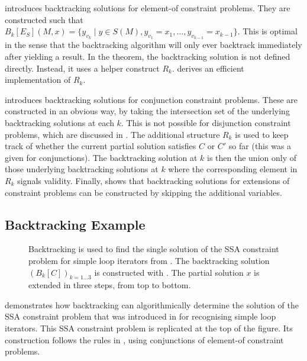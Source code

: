      introduces backtracking solutions for element-of
    constraint problems.
    They are constructed such that
    $B_k[E_S](M,x)=\{y_{v_k}\mid y\in S(M), y_{v_1}=x_1,\dots,y_{v_{k-1}}=x_{k-1}\}$.
    This is optimal in the sense that the backtracking algorithm will only ever
    backtrack immediately after yielding a result.
    In the theorem, the backtracking solution is not defined directly.
    Instead, it uses a helper construct $R_k$.
     derives an efficient implementation of $R_k$.

     introduces backtracking solutions for conjunction
    constraint problems.
    These are constructed in an obvious way, by taking the intersection set of
    the underlying backtracking solutions at each $k$.
    This is not possible for disjunction constraint problems, which are
    discussed in .
    The additional structure $R_k$ is used to keep track of whether the current
    partial solution satisfies $C$ or $C'$ so far
    (this was a given for conjunctions).
    The backtracking solution at $k$ is then the union only of those underlying
    backtracking solutions at $k$ where the corresponding element in $R_k$
    signals validity.
    Finally,  shows that backtracking solutions for extensions
    of constraint problems can be constructed by skipping the
    additional variables.

\subsection{Backtracking Example}

\begin{figure}[p]
    
    \caption{Backtracking is used to find the single solution of the
             SSA constraint problem for simple loop iterators from
             .
             The backtracking solution $(B_k[C])_{k=1\dots3}$ is constructed
             with .
             The partial solution $x$ is extended in three steps, from top
             to bottom.}
    \label{fig:backtracsol}
\end{figure}

     demonstrates how backtracking can algorithmically
    determine the solution of the SSA constraint problem that was introduced in
     for recognising simple loop iterators.
    This SSA constraint problem is replicated at the top of the figure.
    Its construction follows the rules in
    , using conjunctions
    of element-of constraint problems.

